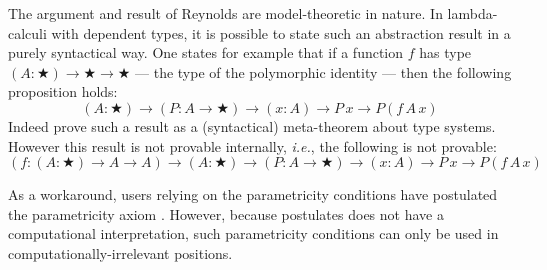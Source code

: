 \documentclass[english]{PaperTools/latex/entcs}
\theoremstyle{plain}
\theoremstyle{definition}
\theoremstyle{remark}
\def\ie{\textit{i.e.}}
\begin{document}
The argument and result of Reynolds are model-theoretic in nature.
In lambda-calculi with dependent types, it is possible to state such an
abstraction result in a purely syntactical way.
One states for example that if a function $f$ has type
$(A : ★) → ★ → ★$ --- the type of the polymorphic identity --- then the
following proposition holds:
$$ (A : ★) → (P : A → ★) → (x : A) → P\, x → P (f\, A\, x) $$
%
Indeed \citet{bernardy_proofs_2012} prove such a result as a
(syntactical) meta-theorem about type systems. However this result is
not provable internally, \ie, the following is not provable:
\begin{equation}
  \label{eq:param-id}
  (f : (A:★) → A → A) →  (A : ★) → (P : A → ★) → (x : A) → P\, x → P (f\, A\, x)
\end{equation}

As a workaround, users relying on the parametricity conditions have
postulated the parametricity axiom
\citep{pouillard_nameless_2011,chlipala_parametric_2008,atkey_unembedding_2009}.
However, %
because postulates does not have a computational interpretation, such
parametricity conditions can only be used in computationally-irrelevant
positions.
\end{document}
